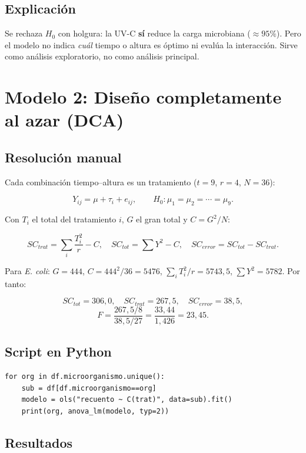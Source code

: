 \documentclass[12pt,a4paper]{article}
\begin{document}
\subsection{Explicación}

Se rechaza $H_0$ con holgura: la UV-C \textbf{sí} reduce la carga microbiana ($\approx 95\%$). Pero el modelo no indica \emph{cuál} tiempo o altura es óptimo ni evalúa la interacción. Sirve como análisis exploratorio, no como análisis principal.

\section{Modelo 2: Diseño completamente al azar (DCA)}

\subsection{Resolución manual}

Cada combinación tiempo--altura es un tratamiento ($t=9$, $r=4$, $N=36$):

\[
Y_{ij} = \mu + \tau_i + e_{ij}, \qquad H_0: \mu_1=\mu_2=\cdots=\mu_9.
\]

Con $T_i$ el total del tratamiento $i$, $G$ el gran total y $C=G^2/N$:

\[
SC_{trat}=\sum_i \frac{T_i^2}{r}-C,\quad
SC_{tot}=\sum Y^2-C,\quad
SC_{error}=SC_{tot}-SC_{trat}.
\]

Para \textit{E. coli}: $G=444$, $C=444^2/36=5476$, $\sum_i T_i^2/r = 5743{,}5$, $\sum Y^2 = 5782$. Por tanto:

\[
SC_{tot}=306{,}0,\quad SC_{trat}=267{,}5,\quad SC_{error}=38{,}5,
\]
\[
F=\frac{267{,}5/8}{38{,}5/27}=\frac{33{,}44}{1{,}426}=23{,}45.
\]

\subsection{Script en Python}

\begin{lstlisting}[caption={ANOVA del DCA por microorganismo.}]
for org in df.microorganismo.unique():
    sub = df[df.microorganismo==org]
    modelo = ols("recuento ~ C(trat)", data=sub).fit()
    print(org, anova_lm(modelo, typ=2))
\end{lstlisting}

\subsection{Resultados}
\end{document}
